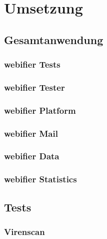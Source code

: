 \chapter{Umsetzung}
\section{Gesamtanwendung}

\subsection{webifier Tests}


\subsection{webifier Tester}


\subsection{webifier Platform}


\subsection{webifier Mail}


\subsection{webifier Data}


\subsection{webifier Statistics}


\section{Tests}

\subsection{Virenscan}


